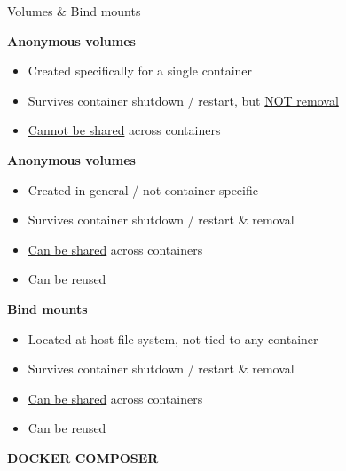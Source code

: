 \documentclass[10pt]{article}
\newcommand{\summary}[2]{\begin{summarybox}{#1}
  #2
  \vspace*{-1.3em}
\end{summarybox}}
\newcommand{\headline}[1]{\textbf{\color{teal}#1}}
\newcommand{\feature}[2]{
  \headline{#1}
  \vspace*{-.5em}
  \begin{itemize}
    \setlength\itemsep{-.1em}
    \small
    #2
  \end{itemize}
  \vspace*{.3em}
}
\newcommand{\mytitle}[1]{
  \begin{center}
    \begin{titlebox}
      {\large \textbf{#1}}
    \end{titlebox}
  \end{center}
  \vspace*{-1.8em}
}
\begin{document}
\begin{multicols*}{2}
  \summary{Volumes \& Bind mounts}{
    \feature{Anonymous volumes}{
      \item Created specifically for a single container
      \item Survives container shutdown / restart, but \underline{NOT removal}
      \item \underline{Cannot be shared} across containers
    }
    \feature{Anonymous volumes}{
      \item Created in general / not container specific
      \item Survives container shutdown / restart \& removal
      \item \underline{Can be shared} across containers
      \item Can be reused
    }
    \feature{Bind mounts}{
      \item Located at host file system, not tied to any container
      \item Survives container shutdown / restart \& removal
      \item \underline{Can be shared} across containers
      \item Can be reused
    }
  }
\end{multicols*}

\newpage

\mytitle{DOCKER COMPOSER}
\end{document}
